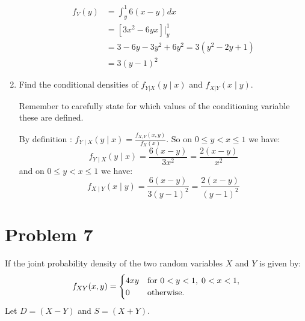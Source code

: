 \documentclass{article}
\newcommand{\1}{\mathbf{1}}
\begin{document}
\begin{enumerate}
    \begin{align*}
    f_Y(y) &= \int_y^1 6(x-y) dx \\
    &= \left[3x^2 - 6yx\right]\bigg|_y^1 \\
    &= 3 - 6y - 3y^2 + 6y^2 = 3(y^2-2y +1)\\
    &=3(y-1)^2
    \end{align*}

    \newpage
    \item Find the conditional densities of $f_{Y|X}(y\mid x)$ and $f_{X|Y}(x\mid y)$.\par
    Remember to carefully state for which values of the conditioning variable these are defined.
    
    By definition : $f_{Y\mid X}(y \mid x) = \frac{f_{X, Y}(x, y)}{f_X(x)}$. So on $0 \leq y < x \leq 1$ we have:
    $$ f_{Y\mid X}(y \mid x) = \frac{6(x-y)}{3x^2} = \frac{2(x-y)}{x^2} $$
    and on $0\leq y < x \leq 1 $ we have:
    $$ f_{X\mid Y}(x \mid y) = \frac{6(x-y)}{3(y-1)^2} = \frac{2(x-y)}{(y-1)^2} $$
   
\end{enumerate}



\newpage
\section*{Problem 7} 
If the joint probability density of the two random variables $X$ and $Y$ is given by:
$$ f_{XY}(x,y) = \begin{cases}
    4xy & \hbox{for } 0 < y<1,\; 0<x <1,\\
    0 & \hbox{otherwise.}
    \end{cases}$$
Let $D=(X-Y)$ and $S=(X+Y)$.  
\end{document}

